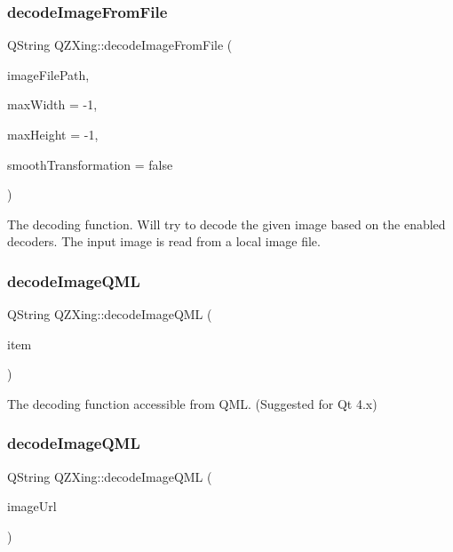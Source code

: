\subsubsection{\texorpdfstring{decode\+Image\+From\+File}{decodeImageFromFile}}
{\footnotesize\ttfamily Q\+String Q\+Z\+Xing\+::decode\+Image\+From\+File (\begin{DoxyParamCaption}\item[{const Q\+String \&}]{image\+File\+Path,  }\item[{int}]{max\+Width = {\ttfamily -\/1},  }\item[{int}]{max\+Height = {\ttfamily -\/1},  }\item[{bool}]{smooth\+Transformation = {\ttfamily false} }\end{DoxyParamCaption})\hspace{0.3cm}{\ttfamily [slot]}}

The decoding function. Will try to decode the given image based on the enabled decoders. The input image is read from a local image file. \mbox{\label{class_q_z_xing_a6cbd54e03d45b91ff0f33125e4f6caa3}} 
\subsubsection{\texorpdfstring{decode\+Image\+Q\+ML}{decodeImageQML}\hspace{0.1cm}{\footnotesize\ttfamily [1/2]}}
{\footnotesize\ttfamily Q\+String Q\+Z\+Xing\+::decode\+Image\+Q\+ML (\begin{DoxyParamCaption}\item[{Q\+Object $\ast$}]{item }\end{DoxyParamCaption})\hspace{0.3cm}{\ttfamily [slot]}}

The decoding function accessible from Q\+ML. (Suggested for Qt 4.\+x) \mbox{\label{class_q_z_xing_aed399aa817f2090d5ac7c9aed51d1b99}} 
\subsubsection{\texorpdfstring{decode\+Image\+Q\+ML}{decodeImageQML}\hspace{0.1cm}{\footnotesize\ttfamily [2/2]}}
{\footnotesize\ttfamily Q\+String Q\+Z\+Xing\+::decode\+Image\+Q\+ML (\begin{DoxyParamCaption}\item[{const Q\+Url \&}]{image\+Url }\end{DoxyParamCaption})\hspace{0.3cm}{\ttfamily [slot]}}

